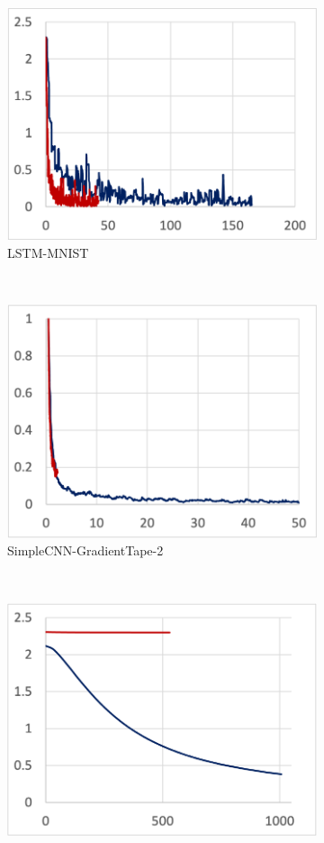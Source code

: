 \begin{figure}%
  \centering
  \begin{subfigure}[t]{.24\textwidth}
    \includegraphics[width=\textwidth]{tape-lstm}
    \caption{LSTM-MNIST}
  \end{subfigure}
  ~ 
  \begin{subfigure}[t]{.36\textwidth}\centering
    \includegraphics[width=.66\textwidth]{tape-simple2}
    \caption{SimpleCNN-GradientTape-2}
  \end{subfigure}
  ~
  \begin{subfigure}[t]{.24\textwidth}
    \includegraphics[width=\textwidth]{keras-cifar}

\end{subfigure}
\end{figure}
